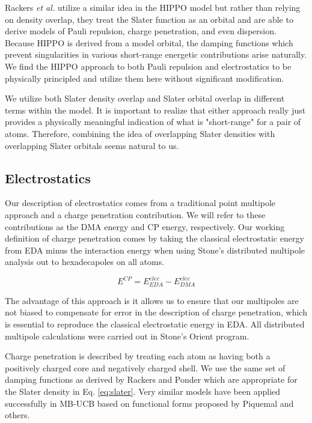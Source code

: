 \documentclass[journal=jacsat,manuscript=article]{achemso}
\begin{document}
Rackers \textit{et al.} utilize a similar idea in the HIPPO model\cite{rackers2021polarizable}
but rather than relying on density overlap, they treat the Slater function as an
orbital and are able to derive models of Pauli repulsion, charge penetration, and
even dispersion. Because HIPPO is derived from a model orbital, the damping functions
which prevent singularities in various short-range energetic contributions arise naturally.
We find the HIPPO approach to both Pauli repulsion and electrostatics to be physically principled
and utilize them here without significant modification.

We utilize both Slater density overlap and Slater orbital overlap in different terms within
the model. It is important to realize that either approach really just provides a
physically meaningful indication of what is "short-range" for a pair of atoms. Therefore,
combining the idea of overlapping Slater densities with overlapping Slater orbitals seems
natural to us.

\subsection*{Electrostatics}

Our description of electrostatics comes from a traditional
point multipole approach and a charge penetration contribution. We will refer to
these contributions as the DMA energy and CP energy, respectively.
Our working definition of charge penetration comes by taking the
classical electrostatic energy from EDA minus the interaction energy
when using Stone's distributed multipole analysis\cite{stone1981distributed,stone1985distributeda}
out to hexadecapoles on all atoms.

\begin{equation}
  E^{CP}=E^{elec}_{EDA}-E^{elec}_{DMA}
  \label{eq:cp}
\end{equation}

The advantage of this approach is it allows us to ensure that
our multipoles are not biased to compensate for error in the
description of charge penetration, which is essential to reproduce
the classical electrostatic energy in EDA.
All distributed multipole calculations were carried out
in Stone's Orient program.\cite{stone2002orient}

Charge penetration is described by treating each atom as having both a positively
charged core and negatively charged shell. We use the same set of damping functions
as derived by Rackers and Ponder which are appropriate for the Slater density in Eq. \ref{eq:slater}.\cite{rackers2021polarizable}
Very similar models have been applied successfully in MB-UCB\cite{das2019development}
based on functional forms proposed by Piquemal\cite{piquemal2003improved} and others\cite{wang2015general,rackers2017optimized}.
\end{document}
